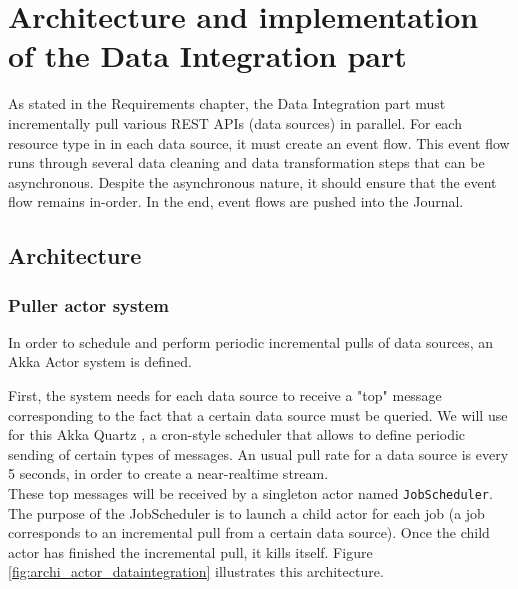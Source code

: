 \chapter{Architecture and implementation of the Data Integration part}

As stated in the Requirements chapter, the Data Integration part must incrementally pull various REST APIs (data sources) in parallel. For each resource type in
in each data source, it must create an event flow. This event flow runs through several data cleaning and data transformation steps that can
be asynchronous. Despite the asynchronous nature, it should ensure that the event flow remains in-order. In the end, event flows are pushed
into the Journal.

\section{Architecture}

\subsection{Puller actor system}

In order to schedule and perform periodic incremental pulls of data sources, an Akka Actor system is defined. 

First, the system needs for each data source to receive a "top" message corresponding to the fact that a certain data source must be queried. We will use for this
Akka Quartz , a cron-style scheduler that allows to define periodic sending of certain types of messages. An usual pull rate for a data source is every 5 seconds, in order to create a near-realtime stream.
\\

These top messages will be received by a singleton actor named \verb|JobScheduler|. The purpose of the JobScheduler is to launch a child actor for each job (a job
corresponds to an incremental pull from a certain data source). Once the child actor has finished the incremental pull, it kills itself. Figure \ref{fig:archi_actor_dataintegration} illustrates this architecture.

